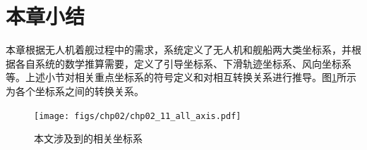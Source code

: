 \section{本章小结}
本章根据无人机着舰过程中的需求，系统定义了无人机和舰船两大类坐标系，并根据各自系统的数学推算需要，定义了引导坐标系、下滑轨迹坐标系、风向坐标系等。上述小节对相关重点坐标系的符号定义和对相互转换关系进行推导。图\ref{fig:chp02_11_all_axis}所示为各个坐标系之间的转换关系。

\begin{figure}[htb]   
	\centering
	\texttt{[image: figs/chp02/chp02\_11\_all\_axis.pdf]}
	\caption{本文涉及到的相关坐标系}
	\label{fig:chp02_11_all_axis}
\end{figure}


